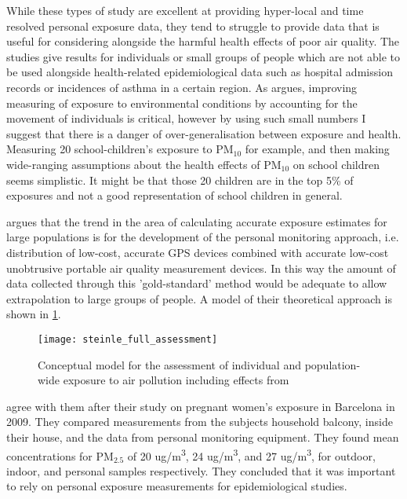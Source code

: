 While these types of study are excellent at providing hyper-local and time resolved personal exposure data, they tend to struggle to provide data that is useful for considering alongside the harmful health effects of poor air quality. The studies give results for individuals or small groups of people which are not able to be used alongside health-related epidemiological data such as hospital admission records or incidences of asthma in a certain region. As \cite{Chaix2013} argues, improving measuring of exposure to environmental conditions by accounting for the movement of individuals is critical, however by using such small numbers I suggest that there is a danger of over-generalisation between exposure and health. Measuring 20 school-children's exposure to PM$_{10}$ for example, and then making wide-ranging assumptions about the health effects of PM$_{10}$ on school children seems simplistic. It might be that those 20 children are in the top 5\% of exposures and not a good representation of school children in general.

\cite{Steinle2013} argues that the trend in the area of calculating accurate exposure estimates for large populations is for the development of the personal monitoring approach, i.e. distribution of low-cost, accurate GPS devices combined with accurate low-cost unobtrusive portable air quality measurement devices. In this way the amount of data collected through this 'gold-standard' method would be adequate to allow extrapolation to large groups of people. A model of their theoretical approach is shown in \ref{fig:steinle_full_assessment}.

\begin{figure}[H]
\centering
\texttt{[image: steinle\_full\_assessment]}
\caption{Conceptual model for the assessment of individual and population-wide exposure to air pollution including effects from \cite{Steinle2013}}
\label{fig:steinle_full_assessment}
\end{figure}

\cite{Minguillon2012} agree with them after their study on pregnant women's exposure in Barcelona in 2009. They compared measurements from the subjects household balcony, inside their house, and the data from personal monitoring equipment. They found mean concentrations for PM$_{2.5}$ of 20 ug/m\textsuperscript{3}, 24 ug/m\textsuperscript{3}, and 27 ug/m\textsuperscript{3}, for outdoor, indoor, and personal samples respectively. They concluded that it was important to rely on personal exposure measurements for epidemiological studies.

